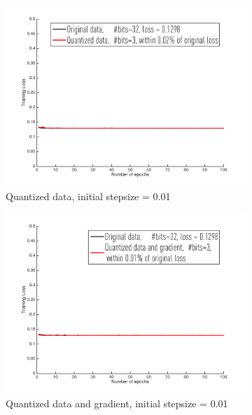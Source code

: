 \documentclass{article}
\begin{document}
\begin{figure}[h]
\centering
    \begin{subfigure}[h]{.3\columnwidth}
    \includegraphics[width=\columnwidth]{lssvm/ijcnn/d001}
    \caption{Quantized data, initial stepsize = 0.01}
    \end{subfigure}
    \begin{subfigure}[h]{.3\columnwidth}
    \includegraphics[width=\columnwidth]{lssvm/ijcnn/dg001}
    \caption{Quantized data and gradient, initial stepsize = 0.01}
    \end{subfigure}
    \begin{subfigure}[h]{.3\columnwidth}

\end{subfigure}
\end{figure}
\end{document}
